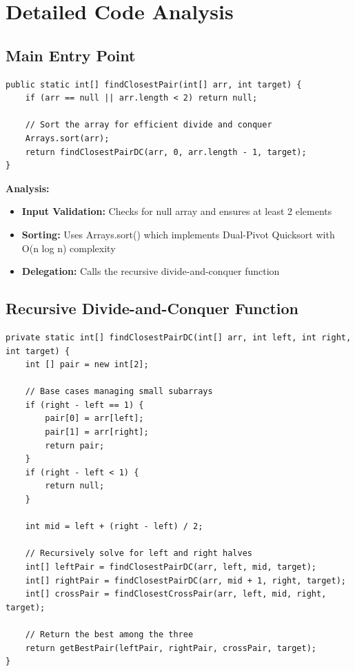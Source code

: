 \documentclass[12pt,a4paper]{article}
\begin{document}
\newpage

\section{Detailed Code Analysis}

\subsection{Main Entry Point}

\begin{lstlisting}[caption=Main Entry Function]
public static int[] findClosestPair(int[] arr, int target) {
    if (arr == null || arr.length < 2) return null;

    // Sort the array for efficient divide and conquer
    Arrays.sort(arr);
    return findClosestPairDC(arr, 0, arr.length - 1, target);
}
\end{lstlisting}

\textbf{Analysis:}
\begin{itemize}
    \item \textbf{Input Validation:} Checks for null array and ensures at least 2 elements
    \item \textbf{Sorting:} Uses Arrays.sort() which implements Dual-Pivot Quicksort with O(n log n) complexity
    \item \textbf{Delegation:} Calls the recursive divide-and-conquer function
\end{itemize}

\subsection{Recursive Divide-and-Conquer Function}

\begin{lstlisting}[caption=Divide and Conquer Implementation]
private static int[] findClosestPairDC(int[] arr, int left, int right, int target) {
    int [] pair = new int[2];
    
    // Base cases managing small subarrays
    if (right - left == 1) {
        pair[0] = arr[left];
        pair[1] = arr[right];
        return pair;
    }
    if (right - left < 1) {
        return null;
    }

    int mid = left + (right - left) / 2;

    // Recursively solve for left and right halves
    int[] leftPair = findClosestPairDC(arr, left, mid, target);
    int[] rightPair = findClosestPairDC(arr, mid + 1, right, target);
    int[] crossPair = findClosestCrossPair(arr, left, mid, right, target);

    // Return the best among the three
    return getBestPair(leftPair, rightPair, crossPair, target);
}
\end{lstlisting}
\end{document}
